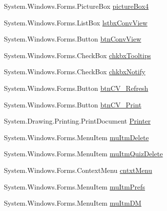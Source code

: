 \begin{DoxyCompactItemize}
\item 
\-System.\-Windows.\-Forms.\-Picture\-Box \hyperlink{class_sr_p___classroom_inq_1_1frm_classrrom_inq_ab68823cc3bc21a92261c2cd687b8d85f}{picture\-Box4}
\item 
\-System.\-Windows.\-Forms.\-List\-Box \hyperlink{class_sr_p___classroom_inq_1_1frm_classrrom_inq_aa78736e6fefabc449eb2ac37ce4f5f60}{lstbx\-Conv\-View}
\item 
\-System.\-Windows.\-Forms.\-Button \hyperlink{class_sr_p___classroom_inq_1_1frm_classrrom_inq_ab75b7c14e1f4b71b6513122c99dbe532}{btn\-Conv\-View}
\item 
\-System.\-Windows.\-Forms.\-Check\-Box \hyperlink{class_sr_p___classroom_inq_1_1frm_classrrom_inq_a1952935fe5b823dcc597f5aafd7436aa}{chkbx\-Tooltips}
\item 
\-System.\-Windows.\-Forms.\-Check\-Box \hyperlink{class_sr_p___classroom_inq_1_1frm_classrrom_inq_a86f98a8c743985a65d129f24ed240ba6}{chkbx\-Notify}
\item 
\-System.\-Windows.\-Forms.\-Button \hyperlink{class_sr_p___classroom_inq_1_1frm_classrrom_inq_acab3b8f1dd8b8c6298dd2c11aa764a29}{btn\-C\-V\-\_\-\-Refresh}
\item 
\-System.\-Windows.\-Forms.\-Button \hyperlink{class_sr_p___classroom_inq_1_1frm_classrrom_inq_aa974c0ec46e2bca7bea74774e0f460d4}{btn\-C\-V\-\_\-\-Print}
\item 
\-System.\-Drawing.\-Printing.\-Print\-Document \hyperlink{class_sr_p___classroom_inq_1_1frm_classrrom_inq_a27d138482c23d40f494f49984816227e}{\-Printer}
\item 
\-System.\-Windows.\-Forms.\-Menu\-Item \hyperlink{class_sr_p___classroom_inq_1_1frm_classrrom_inq_afb6bae444aa0f2084f3d447454a29e47}{mu\-Itm\-Delete}
\item 
\-System.\-Windows.\-Forms.\-Menu\-Item \hyperlink{class_sr_p___classroom_inq_1_1frm_classrrom_inq_a2d03550cfd9c6e91732a9a669089cb48}{mu\-Itm\-Quiz\-Delete}
\item 
\-System.\-Windows.\-Forms.\-Context\-Menu \hyperlink{class_sr_p___classroom_inq_1_1frm_classrrom_inq_a7fb167457515aba637054c47a301188e}{cntxt\-Menu}
\item 
\-System.\-Windows.\-Forms.\-Menu\-Item \hyperlink{class_sr_p___classroom_inq_1_1frm_classrrom_inq_a13631d0933d2eb8825ef015322073644}{mu\-Itm\-Prefs}
\item 
\-System.\-Windows.\-Forms.\-Menu\-Item \hyperlink{class_sr_p___classroom_inq_1_1frm_classrrom_inq_a1ab66b5e5506390fd7dab2fae510c610}{mu\-Itm\-D\-M}
\item 

\end{DoxyCompactItemize}
